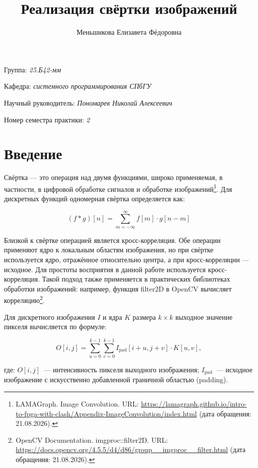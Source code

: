 \documentclass[a4paper, 12pt]{article}
\title{Реализация свёртки изображений}
\author{Меньшикова Елизавета Фёдоровна}
\date{}
\begin{document}
\maketitle

\begin{flushright}
    Группа: \emph{25.Б42-мм}

    Кафедра: \emph{системного программирования СПбГУ}

    Научный руководитель: \emph{Пономарев Николай Алексеевич}
    
    Номер семестра практики: \emph{2}
\end{flushright} 

\section{Введение}

Свёртка --- это операция над двумя функциями, широко применяемая, в частности, в цифровой обработке сигналов и обработке изображений\footnote{\tiny LAMAGraph. Image Convolution. URL: \url{https://lamagraph.github.io/intro-to-fpga-with-clash/Appendix-ImageConvolution/index.html} (дата обращения: 21.08.2026).}. Для дискретных функций одномерная свёртка определяется как:

\begin{equation*}
    (f * g)[n] = \sum_{m=-\infty}^{\infty} f[m] \cdot g[n - m]
\end{equation*}

Близкой к свёртке операцией является кросс-корреляция. Обе операции применяют ядро к локальным областям изображения, но при свёртке используется ядро, отражённое относительно центра, а при кросс-корреляции --- исходное. Для простоты восприятия в данной работе используется кросс-корреляция. Такой подход также применяется в практических библиотеках обработки изображений: например, функция filter2D в OpenCV вычисляет корреляцию\footnote{\tiny OpenCV Documentation. imgproc::filter2D. URL: \url{https://docs.opencv.org/4.5.5/d4/d86/group__imgproc__filter.html} (дата обращения: 21.08.2026).}.

Для дискретного изображения $I$ и ядра $K$ размера $k \times k$ выходное значение пикселя вычисляется по формуле:

\begin{equation*}
    O[i, j] = \sum_{u=0}^{k-1} \sum_{v=0}^{k-1} I_{\text{pad}}[i + u, j + v] \cdot K[u, v],
\end{equation*}

где:
$O[i,j]$~--- интенсивность пикселя выходного изображения; $I_{\text{pad}}$~--- исходное изображение с искусственно добавленной граничной областью (padding).
\end{document}
